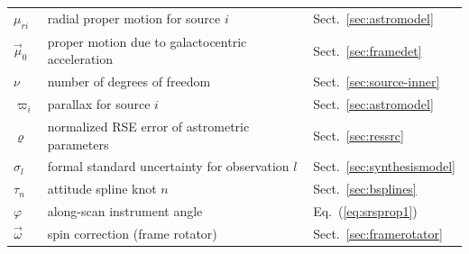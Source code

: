 \documentclass[structabstract]{aa}
\begin{document}
\begin{longtable}{lll}
$\mu_{ri}$ & radial proper motion for source $i$ &Sect.~\ref{sec:astromodel} \\
$\vec{\mu}_0$ & proper motion due to galactocentric acceleration & Sect.~\ref{sec:framedet}\\
$\nu$ &  number of degrees of freedom & Sect.~\ref{sec:source-inner}\\
$\varpi_i$ & parallax for source $i$  &Sect.~\ref{sec:astromodel} \\
$\varrho$ & normalized RSE error of astrometric parameters & Sect.~\ref{sec:ressrc}\\
$\sigma_l$ & formal standard uncertainty for observation $l$ & Sect.~\ref{sec:synthesismodel} \\
$\tau_n$ & attitude spline knot $n$ & Sect.~\ref{sec:bsplines} \\
$\varphi$ & along-scan instrument angle & Eq.~(\ref{eq:srsprop1}) \\
$\vec{\omega}$ & spin correction (frame rotator)  &Sect.~\ref{sec:framerotator} \\
\end{longtable}
 
\end{document}
